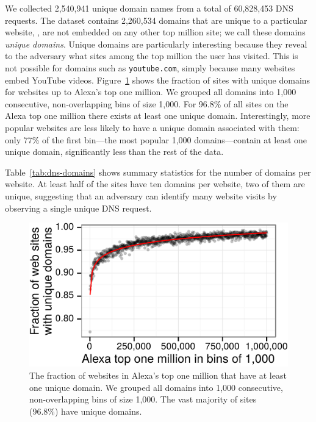 We collected 2,540,941 unique domain names from a total of 60,828,453 DNS
requests. The dataset contains 2,260,534 domains that are unique to a particular
website, \ie, are not embedded on any other top million site; we call these
domains {\em unique domains}. Unique domains are particularly interesting
because they reveal to the adversary what sites among the top million the user
has visited.  This is not possible for domains such as {\tt youtube.com}, simply
because many websites embed YouTube videos.  Figure~\ref{fig:unique-domains}
shows the fraction of sites with unique domains for websites up to Alexa's top
one million.  We grouped all domains into 1,000 consecutive, non-overlapping
bins of size 1,000.  For 96.8\% of all sites on the Alexa top one million there
exists at least one unique domain.  Interestingly, more popular websites are
less likely to have a unique domain associated with them: only 77\% of the first
bin---the most popular 1,000 domains---contain at least one unique domain,
significantly less than the rest of the data.

Table~\ref{tab:dns-domains} shows summary statistics for the number of domains
per website. At least half of the sites have ten domains per website, two of
them are unique, suggesting that an adversary can identify many website visits
by observing a single unique DNS request.

\begin{figure}[t]
	\centering
	\includegraphics[width=0.75\linewidth]{figures/dns-unique-domains.pdf}
	\caption{The fraction of websites in Alexa's top one million that have at
	least one unique domain.  We grouped all domains into 1,000 consecutive,
	non-overlapping bins of size 1,000.  The vast majority of sites (96.8\%)
	have unique domains.}
	\label{fig:unique-domains}
\end{figure}


